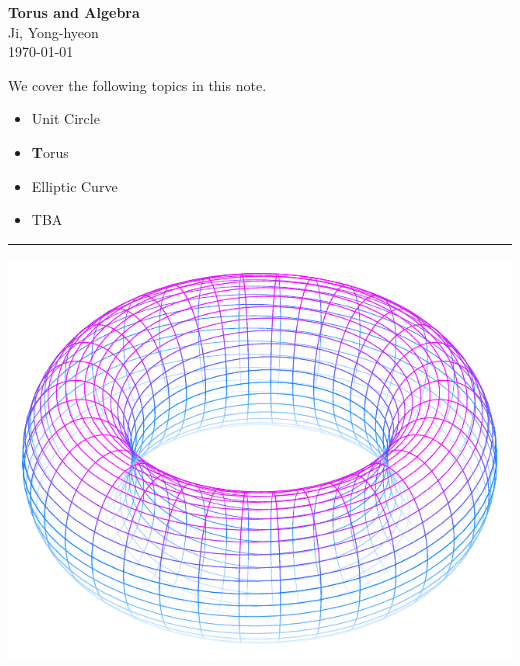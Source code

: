 \documentclass[11pt,openany]{article}
\begin{document}
\begin{center}
	\huge\textbf{{\color{red}T}{\color{orange}o}{\color{green!75!black}r}{\color{cyan}u}{\color{violet}s} and Algebra}\\
	\vspace{0.5em}
	\large{Ji, Yong-hyeon}\\
	\vspace{0.5em}
	\normalsize{\today}\\
\end{center}

\noindent 
We cover the following topics in this note.
\begin{itemize}
	\item Unit Circle
	\item {\bfseries\color{red}T}{\color{orange}o}{\color{green!75!black}r}{\color{cyan}u}{\color{violet}s}
	\item Elliptic Curve
	\item TBA
\end{itemize}
\hrule\vspace{12pt}
\vspace{20pt}
\begin{center}
\includegraphics[scale=1.5]{torus.pdf}
\end{center}

\newpage
\tableofcontents

\newpage
\end{document}
